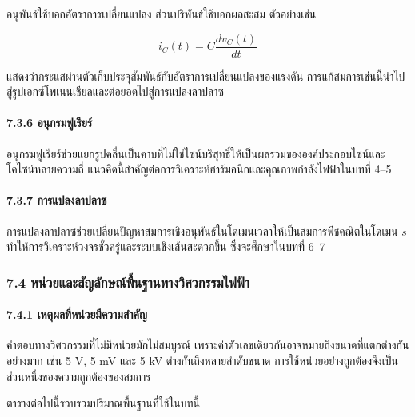 อนุพันธ์ใช้บอกอัตราการเปลี่ยนแปลง ส่วนปริพันธ์ใช้บอกผลสะสม ตัวอย่างเช่น

\[
i_C(t)=C\frac{dv_C(t)}{dt}
\]

แสดงว่ากระแสผ่านตัวเก็บประจุสัมพันธ์กับอัตราการเปลี่ยนแปลงของแรงดัน การแก้สมการเช่นนี้นำไปสู่รูปเอกซ์โพเนนเชียลและต่อยอดไปสู่การแปลงลาปลาซ

\paragraph{7.3.6 อนุกรมฟูเรียร์}

อนุกรมฟูเรียร์ช่วยแยกรูปคลื่นเป็นคาบที่ไม่ใช่ไซน์บริสุทธิ์ให้เป็นผลรวมขององค์ประกอบไซน์และโคไซน์หลายความถี่ แนวคิดนี้สำคัญต่อการวิเคราะห์ฮาร์มอนิกและคุณภาพกำลังไฟฟ้าในบทที่ 4–5

\paragraph{7.3.7 การแปลงลาปลาซ}

การแปลงลาปลาซช่วยเปลี่ยนปัญหาสมการเชิงอนุพันธ์ในโดเมนเวลาให้เป็นสมการพีชคณิตในโดเมน $s$ ทำให้การวิเคราะห์วงจรชั่วครู่และระบบเชิงเส้นสะดวกขึ้น ซึ่งจะศึกษาในบทที่ 6–7

 

\subsubsection{7.4 หน่วยและสัญลักษณ์พื้นฐานทางวิศวกรรมไฟฟ้า}

\paragraph{7.4.1 เหตุผลที่หน่วยมีความสำคัญ}

คำตอบทางวิศวกรรมที่ไม่มีหน่วยมักไม่สมบูรณ์ เพราะค่าตัวเลขเดียวกันอาจหมายถึงขนาดที่แตกต่างกันอย่างมาก เช่น 5 V, 5 mV และ 5 kV ต่างกันถึงหลายลำดับขนาด การใช้หน่วยอย่างถูกต้องจึงเป็นส่วนหนึ่งของความถูกต้องของสมการ

ตารางต่อไปนี้รวบรวมปริมาณพื้นฐานที่ใช้ในบทนี้


